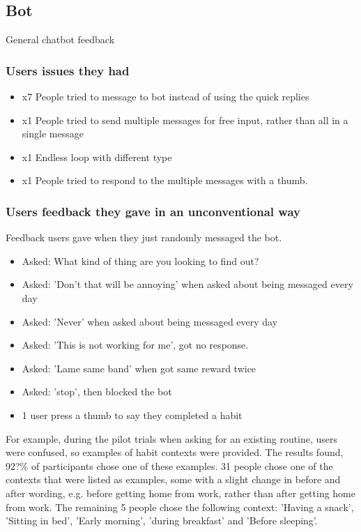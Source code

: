 \documentclass{scaffold/sigchi}
\begin{document}
\subsection{Bot}
General chatbot feedback


\subsubsection{Users issues they had}

\begin{itemize}
  \item x7 People tried to message to bot instead of using the quick replies
  \item x1 People tried to send multiple messages for free input, rather than all in a single message
  \item x1 Endless loop with different type
  \item x1 People tried to respond to the multiple messages with a thumb.
\end{itemize}


\subsubsection{Users feedback they gave in an unconventional way}
Feedback users gave when they just randomly messaged the bot.

\begin{itemize}
  \item Asked: What kind of thing are you looking to find out?
  \item Asked: 'Don't that will be annoying' when asked about being messaged every day
  \item Asked: 'Never' when asked about being messaged every day
  \item Asked: 'This is not working for me', got no response.
  \item Asked: 'Lame same band' when got same reward twice
  \item Asked: 'stop', then blocked the bot
  \item 1 user press a thumb to say they completed a habit
\end{itemize}

For example, during the pilot trials when asking for an existing routine, users were confused, so examples of habit contexts were provided. The results found, 92?\% of participants chose one of these examples.
31 people chose one of the contexts that were listed as examples, some with a slight change in before and after wording, e.g. before getting home from work, rather than after getting home from work. The remaining 5 people chose the following context: 'Having a snack', 'Sitting in bed', 'Early morning', 'during breakfast' and 'Before sleeping'.
\end{document}
